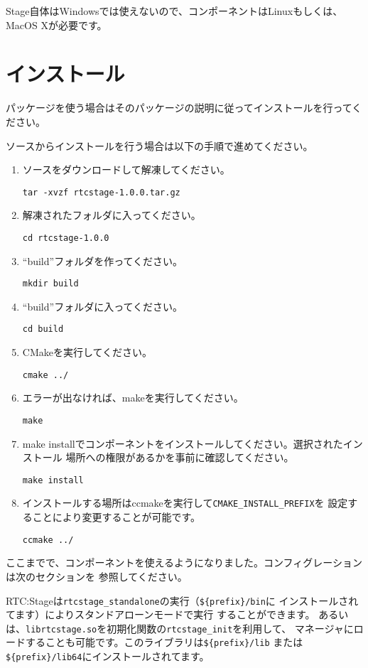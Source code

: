 \documentclass[a4paper,10pt]{article}
\newenvironment{Japanese}{%
  \CJKfamily{min}%
  \CJKtilde
  \CJKnospace}{}
\begin{document}
\begin{CJK}{UTF8}{}
\begin{Japanese}
Stage自体はWindowsでは使えないので、コンポーネントはLinuxもしくは、MacOS Xが必要です。

\section{インストール}
\label{sec:installation}

パッケージを使う場合はそのパッケージの説明に従ってインストールを行ってください。

ソースからインストールを行う場合は以下の手順で進めてください。

\begin{enumerate}
  \item ソースをダウンロードして解凍してください。

  \verb|tar -xvzf rtcstage-1.0.0.tar.gz|
  \item 解凍されたフォルダに入ってください。

  \verb|cd rtcstage-1.0.0|
  \item ``build''フォルダを作ってください。

  \verb|mkdir build|
  \item ``build''フォルダに入ってください。

  \verb|cd build|
  \item CMakeを実行してください。

  \verb|cmake ../|
  \item エラーが出なければ、makeを実行してください。

  \verb|make|
  \item make
  installでコンポーネントをインストールしてください。選択されたインストール
  場所への権限があるかを事前に確認してください。

  \verb|make install|
  \item
  インストールする場所はccmakeを実行して\verb|CMAKE_INSTALL_PREFIX|を
  設定することにより変更することが可能です。

  \verb|ccmake ../|
\end{enumerate}

ここまでで、コンポーネントを使えるようになりました。コンフィグレーションは次のセクションを
参照してください。

RTC:Stageは\verb|rtcstage_standalone|の実行（\verb|${prefix}/bin|に
インストールされてます）によりスタンドアローンモードで実行 することができます。
あるいは、\verb|librtcstage.so|を初期化関数の\verb|rtcstage_init|を利用して、
マネージャにロードすることも可能です。このライブラリは\verb|${prefix}/lib|
または\verb|${prefix}/lib64|にインストールされてます。



\end{Japanese}
\end{CJK}
\end{document}
